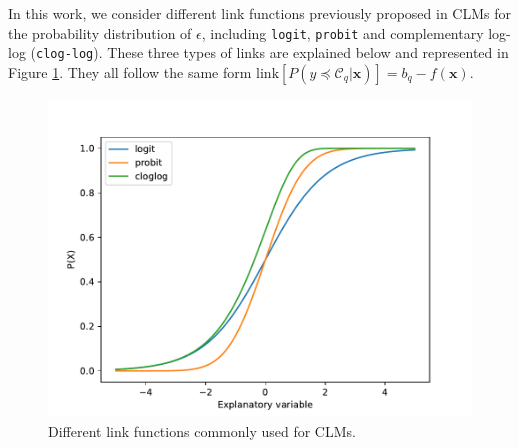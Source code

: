 \documentclass[preprint]{elsarticle}
\begin{document}
In this work, we consider different link functions previously proposed in CLMs for the probability distribution of $\epsilon$, including \texttt{logit}, \texttt{probit} and complementary log-log (\texttt{clog-log}). These three types of links are explained below and represented in Figure \ref{fig:linkfunctions}. They all follow the same form $\text{link}[P(y \preceq \mathcal{C}_q | \mathbf{x})] = b_q - f(\mathbf{x})$.

\begin{figure}[!t]
	\centering
	\includegraphics[width=\columnwidth]{img/linkfunctions.pdf}
	\caption{Different link functions commonly used for CLMs.}
	\label{fig:linkfunctions}
\end{figure}
\end{document}
